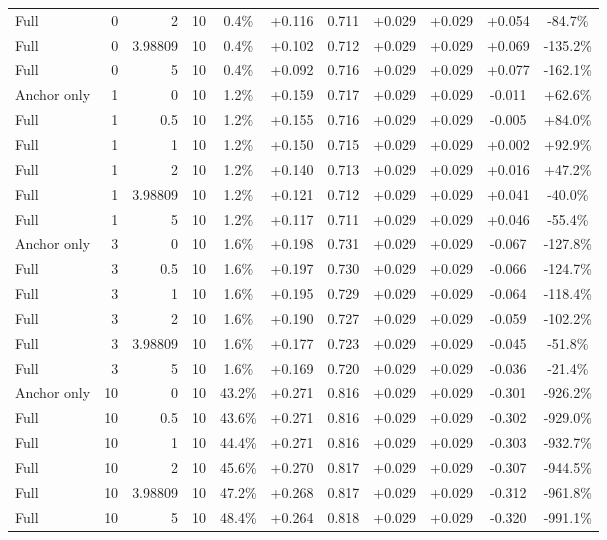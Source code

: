 \begin{table}[htbp]
\begin{tabular}{lrrrccccccc}
Full & 0 & 2 & 10 & 0.4\% & +0.116 & 0.711 & +0.029 & +0.029 & +0.054 & -84.7\% \\
Full & 0 & 3.98809 & 10 & 0.4\% & +0.102 & 0.712 & +0.029 & +0.029 & +0.069 & -135.2\% \\
Full & 0 & 5 & 10 & 0.4\% & +0.092 & 0.716 & +0.029 & +0.029 & +0.077 & -162.1\% \\
Anchor only & 1 & 0 & 10 & 1.2\% & +0.159 & 0.717 & +0.029 & +0.029 & -0.011 & +62.6\% \\
Full & 1 & 0.5 & 10 & 1.2\% & +0.155 & 0.716 & +0.029 & +0.029 & -0.005 & +84.0\% \\
Full & 1 & 1 & 10 & 1.2\% & +0.150 & 0.715 & +0.029 & +0.029 & +0.002 & +92.9\% \\
Full & 1 & 2 & 10 & 1.2\% & +0.140 & 0.713 & +0.029 & +0.029 & +0.016 & +47.2\% \\
Full & 1 & 3.98809 & 10 & 1.2\% & +0.121 & 0.712 & +0.029 & +0.029 & +0.041 & -40.0\% \\
Full & 1 & 5 & 10 & 1.2\% & +0.117 & 0.711 & +0.029 & +0.029 & +0.046 & -55.4\% \\
Anchor only & 3 & 0 & 10 & 1.6\% & +0.198 & 0.731 & +0.029 & +0.029 & -0.067 & -127.8\% \\
Full & 3 & 0.5 & 10 & 1.6\% & +0.197 & 0.730 & +0.029 & +0.029 & -0.066 & -124.7\% \\
Full & 3 & 1 & 10 & 1.6\% & +0.195 & 0.729 & +0.029 & +0.029 & -0.064 & -118.4\% \\
Full & 3 & 2 & 10 & 1.6\% & +0.190 & 0.727 & +0.029 & +0.029 & -0.059 & -102.2\% \\
Full & 3 & 3.98809 & 10 & 1.6\% & +0.177 & 0.723 & +0.029 & +0.029 & -0.045 & -51.8\% \\
Full & 3 & 5 & 10 & 1.6\% & +0.169 & 0.720 & +0.029 & +0.029 & -0.036 & -21.4\% \\
Anchor only & 10 & 0 & 10 & 43.2\% & +0.271 & 0.816 & +0.029 & +0.029 & -0.301 & -926.2\% \\
Full & 10 & 0.5 & 10 & 43.6\% & +0.271 & 0.816 & +0.029 & +0.029 & -0.302 & -929.0\% \\
Full & 10 & 1 & 10 & 44.4\% & +0.271 & 0.816 & +0.029 & +0.029 & -0.303 & -932.7\% \\
Full & 10 & 2 & 10 & 45.6\% & +0.270 & 0.817 & +0.029 & +0.029 & -0.307 & -944.5\% \\
Full & 10 & 3.98809 & 10 & 47.2\% & +0.268 & 0.817 & +0.029 & +0.029 & -0.312 & -961.8\% \\
Full & 10 & 5 & 10 & 48.4\% & +0.264 & 0.818 & +0.029 & +0.029 & -0.320 & -991.1\% \\

\end{tabular}
\end{table}
